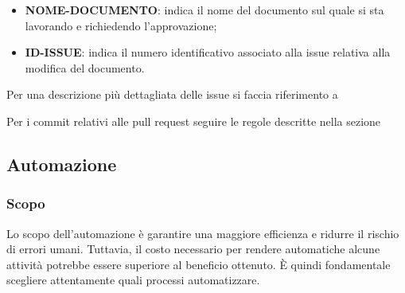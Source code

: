 \begin{itemize}
    \item \textbf{NOME-DOCUMENTO}: indica il nome del documento sul quale si sta lavorando e richiedendo l'approvazione;
    \item \textbf{ID-ISSUE}: indica il numero identificativo associato alla issue relativa alla modifica del documento.
\end{itemize}

Per una descrizione più dettagliata delle issue si faccia riferimento a

Per i commit relativi alle pull request seguire le regole descritte nella
sezione 

\subsection{Automazione}
\subsubsection{Scopo}
Lo scopo dell'automazione è garantire una maggiore efficienza e ridurre il
rischio di errori umani. Tuttavia, il costo necessario per rendere automatiche
alcune attività potrebbe essere superiore al beneficio ottenuto. È quindi
fondamentale scegliere attentamente quali processi automatizzare.
